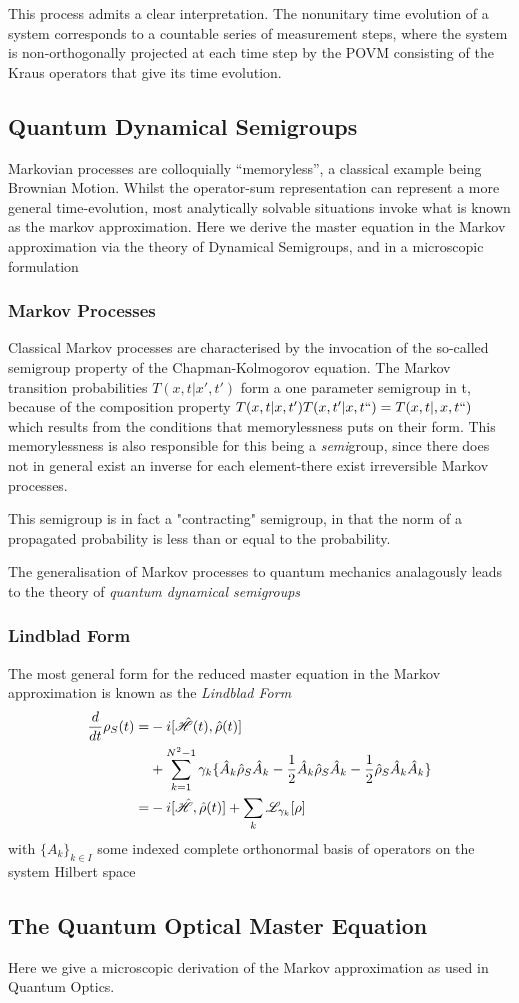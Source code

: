 This process admits a clear interpretation.
The nonunitary time evolution of a system corresponds to a countable series of measurement steps, where the system is non-orthogonally projected at each time step by the POVM consisting of the Kraus operators that give its time evolution.

\subsection{Quantum Dynamical Semigroups}
Markovian processes are colloquially ``memoryless'', a classical example being Brownian Motion.
Whilst the operator-sum representation can represent a more general time-evolution, most analytically solvable situations invoke what is known as the markov approximation.
Here we derive the master equation in the Markov approximation via the theory of Dynamical Semigroups, and in a microscopic formulation

\subsubsection{Markov Processes}
Classical Markov processes are characterised by the invocation of the so-called semigroup property of the Chapman-Kolmogorov equation.
The Markov transition probabilities $T(x, t|x', t')$ form a one parameter semigroup in t, because of the composition property $T(x, t|x, t')T(x, t'|x, t``) = T(x, t|,x, t``)$ which results from the conditions that memorylessness puts on their form.
This memorylessness is also responsible for this being a \emph{semi}group, since there does not in general exist an inverse for each element-there exist irreversible Markov processes.

This semigroup is in fact a "contracting" semigroup, in that the norm of a propagated probability is less than or equal to the probability.

The generalisation of Markov processes to quantum mechanics analagously leads to the theory of \emph{quantum dynamical semigroups}

\subsubsection{Lindblad Form}
The most general form \cite[119--122]{Breuer2002} for the reduced master equation in the Markov approximation is known as the \emph{Lindblad Form}
\begin{align}
        \frac{d}{dt} \rho_S (t) =& -i[\hat{\mathscr{H}} (t), \hat{\rho} (t)\notag]\\
                                 & + \sum_{k=1}^{N^2-1} \gamma_k \{ \hat{A}_k \hat{\rho}_S \hat{A}_k -\frac{1}{2}  \hat{A}_k \hat{\rho}_S \hat{A}_k -\frac{1}{2} \hat{\rho}_S \hat{A}_k \hat{A}_k \}\\
        = & -i[\hat{\mathscr{H}}, \hat{\rho}(t)]+ \sum_k \mathscr{L}_{\gamma_{k}} [\rho]
\end{align}
with ${\{A_k\}}_{k \in I}$ some indexed complete orthonormal basis of operators on the system Hilbert space

\subsection{The Quantum Optical Master Equation} \cite{Breuer2002} \cite{Walls2008}
Here we give a microscopic derivation of the Markov approximation as used in Quantum Optics.

